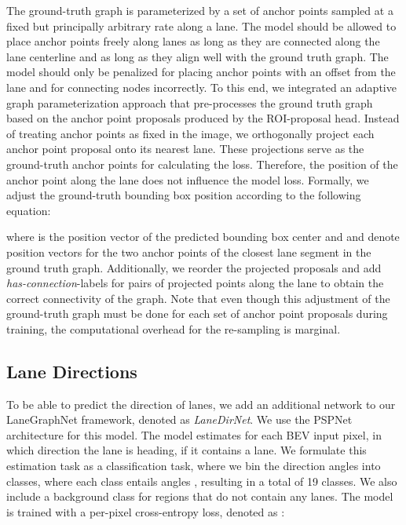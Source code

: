 \documentclass[letterpaper, 10 pt, conference]{ieeeconf}
\begin{document}
The ground-truth graph is parameterized by a set of anchor points sampled at a fixed but principally arbitrary rate along a  lane. The model should be allowed to place anchor points freely along lanes as long as they are connected along the lane centerline and as long as they align well with the ground truth graph. The model should only be penalized for placing anchor points with an offset from the lane and for connecting nodes incorrectly. To this end, we integrated an adaptive graph parameterization approach that pre-processes the ground truth graph based on the anchor point proposals produced by the ROI-proposal head. Instead of treating anchor points as fixed in the image, we orthogonally project each anchor point proposal onto its nearest lane. These projections serve as the ground-truth anchor points for calculating the loss. Therefore, the position of the anchor point along the lane does not influence the model loss. Formally, we adjust the ground-truth bounding box position according to the following equation:



where  is the position vector of the predicted bounding box center and  and  denote position vectors for the two anchor points of the closest lane segment in the ground truth graph. Additionally, we reorder the projected proposals and add \textit{has-connection}-labels for pairs of projected points along the lane to obtain the correct connectivity of the graph. Note that even though this adjustment of the ground-truth graph must be done for each set of anchor point proposals during training, the computational overhead for the re-sampling is marginal.

\subsection{Lane Directions}

To be able to predict the direction of lanes, we add an additional network to our LaneGraphNet framework, denoted as \textit{LaneDirNet}. We use the PSPNet architecture \cite{zhao2017pyramid} for this model. The model estimates for each BEV input pixel, in which direction the lane is heading, if it contains a lane. We formulate this estimation task as a classification task, where we bin the direction angles  into classes, where each class entails angles , resulting in a total of 19 classes. We also include a background class for regions that do not contain any lanes. The model is trained with a per-pixel cross-entropy loss, denoted as :
\end{document}
